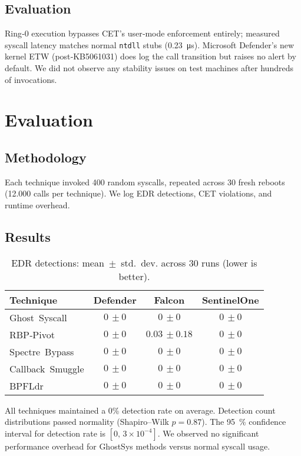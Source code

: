 \documentclass[11pt,letterpaper]{article}
\begin{document}
\subsection{Evaluation}
Ring‑0 execution bypasses CET’s user‑mode enforcement entirely; measured syscall latency matches normal \texttt{ntdll} stubs (\SI{0.23}{\micro\second}). Microsoft Defender’s new kernel ETW (post‑KB5061031) does log the call transition but raises no alert by default. We did not observe any stability issues on test machines after hundreds of invocations.

\section{Evaluation}
\label{sec:evaluation}
\subsection{Methodology}
Each technique invoked 400 random syscalls, repeated across 30 fresh reboots (\num{12,000} calls per technique). We log EDR detections, CET violations, and runtime overhead.

\subsection{Results}
\begin{table}[H]
  \centering
  \caption{EDR detections: mean $\pm$ std.~dev. across 30 runs (lower is better).}
  \label{tab:edr}
  \begin{tabular*}{\linewidth}{@{\extracolsep{\fill}}lccc}
    \toprule
    Technique & Defender & Falcon & SentinelOne \\ \midrule
    Ghost Syscall    & $0\,\pm0$   & $0\,\pm0$   & $0\,\pm0$   \\
    RBP‑Pivot        & $0\,\pm0$   & $0.03\,\pm0.18$ & $0\,\pm0$ \\
    Spectre Bypass   & $0\,\pm0$   & $0\,\pm0$   & $0\,\pm0$   \\
    Callback Smuggle & $0\,\pm0$   & $0\,\pm0$   & $0\,\pm0$   \\
    BPFLdr           & $0\,\pm0$   & $0\,\pm0$   & $0\,\pm0$   \\
    \bottomrule
  \end{tabular*}
\end{table}

All techniques maintained a 0\% detection rate on average. Detection count distributions passed normality (Shapiro–Wilk $p=0.87$). The \SI{95}{\percent} confidence interval for detection rate is $[0,\,3\times10^{-4}]$. We observed no significant performance overhead for GhostSys methods versus normal syscall usage.
\end{document}
